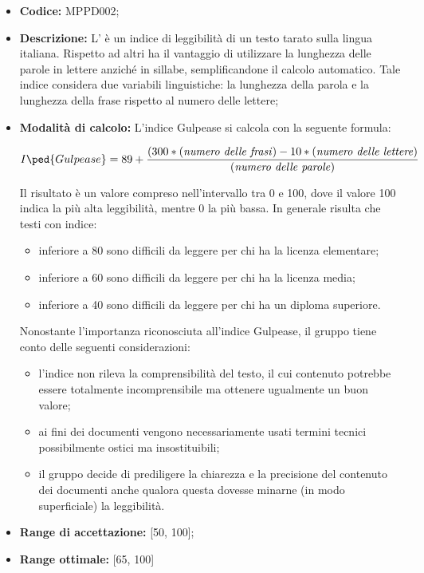 \documentclass[../NormediProgetto.tex]{subfiles}
\begin{document}
\begin{itemize}
	\item \textbf{Codice:} MPPD002;
	
	\item \textbf{Descrizione:} L’ è un indice di leggibilità di un testo tarato sulla lingua italiana. Rispetto ad altri ha il vantaggio di utilizzare la lunghezza delle parole in lettere anziché in sillabe, semplificandone il calcolo automatico. Tale indice considera due variabili linguistiche: la lunghezza della parola e la lunghezza della frase rispetto al numero delle lettere;
	
	\item \textbf{Modalità di calcolo:} L'indice Gulpease si calcola con la seguente formula:
	
	\[ I\ped{Gulpease} = 89 +  \frac{(300*(\textrm{\textit{numero delle frasi}})-10*(\textrm{\textit{numero delle lettere}})}{(\textrm{\textit{numero delle parole}})} \]
	
	Il risultato è un valore compreso nell’intervallo tra 0 e 100, dove il valore 100 indica la
	più alta leggibilità, mentre 0 la più bassa. In generale risulta che testi con indice:
	\begin{itemize}
		\item inferiore a 80 sono difficili da leggere per chi ha la licenza elementare; 
		\item inferiore a 60 sono difficili da leggere per chi ha la licenza media;
		\item inferiore a 40 sono difficili da leggere per chi ha un diploma superiore.
	\end{itemize}
	
	Nonostante l'importanza riconosciuta all'indice Gulpease, il gruppo tiene conto delle seguenti considerazioni:
	\begin{itemize}
		\item l'indice non rileva la comprensibilità del testo, il cui contenuto potrebbe essere totalmente incomprensibile ma ottenere ugualmente un buon valore; 
		\item ai fini dei documenti vengono necessariamente usati termini tecnici possibilmente ostici ma insostituibili;
		\item il gruppo decide di prediligere la chiarezza e la precisione del contenuto dei documenti anche qualora questa dovesse minarne (in modo superficiale) la leggibilità.
	\end{itemize}
	
	\item \textbf{Range di accettazione:} [50, 100];
	\item \textbf{Range ottimale:} [65, 100]
\end{itemize}
\end{document}
